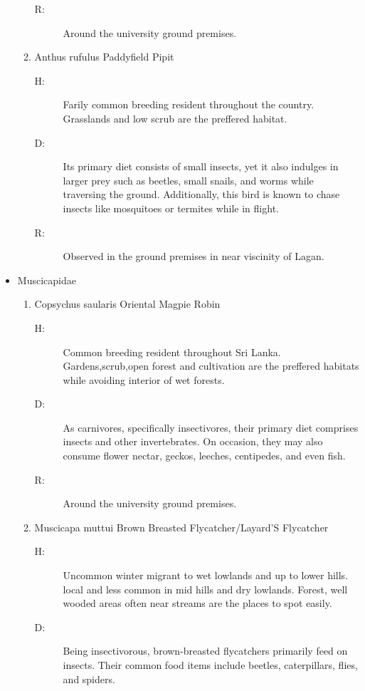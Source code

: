 \begin{itemize}
\begin{enumerate}
\begin{description}
\item[R: ]%
Around the university ground premises.%
\end{description}%
\item%
Anthus rufulus\newline%
Paddyfield Pipit%
\begin{description}%
\item[H: ]%
Farily common breeding resident throughout the country. Grasslands and low scrub are the preffered habitat.%
\item[D: ]%
Its primary diet consists of small insects, yet it also indulges in larger prey such as beetles, small snails, and worms while traversing the ground. Additionally, this bird is known to chase insects like mosquitoes or termites while in flight.%
\item[R: ]%
Observed in the ground premises in near viscinity of Lagan.%
\end{description}%
\end{enumerate}%
\item%
Muscicapidae%
\begin{enumerate}%
\item%
Copsychus saularis\newline%
Oriental Magpie Robin%
\begin{description}%
\item[H: ]%
Common breeding resident throughout Sri Lanka. Gardens,scrub,open forest and cultivation are the preffered habitats while avoiding interior of wet forests.%
\item[D: ]%
As carnivores, specifically insectivores, their primary diet comprises insects and other invertebrates. On occasion, they may also consume flower nectar, geckos, leeches, centipedes, and even fish.%
\item[R: ]%
Around the university ground premises.%
\end{description}%
\item%
Muscicapa muttui\newline%
Brown Breasted Flycatcher/Layard'S Flycatcher%
\begin{description}%
\item[H: ]%
Uncommon winter migrant to wet lowlands and up to lower hills. local and less common in mid hills and dry lowlands. Forest, well wooded areas often near streams are the places to spot easily.%
\item[D: ]%
Being insectivorous, brown{-}breasted flycatchers primarily feed on insects. Their common food items include beetles, caterpillars, flies, and spiders.%

\end{description}
\end{enumerate}
\end{itemize}
